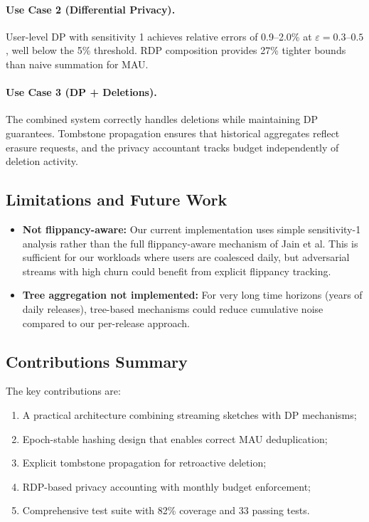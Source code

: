 \documentclass[11pt]{article}
\begin{document}
\paragraph{Use Case 2 (Differential Privacy).} User-level DP with sensitivity 1 achieves relative errors of 0.9--2.0\% at $\varepsilon = 0.3$--$0.5$, well below the 5\% threshold. RDP composition provides 27\% tighter bounds than naive summation for MAU.

\paragraph{Use Case 3 (DP + Deletions).} The combined system correctly handles deletions while maintaining DP guarantees. Tombstone propagation ensures that historical aggregates reflect erasure requests, and the privacy accountant tracks budget independently of deletion activity.

\subsection{Limitations and Future Work}

\begin{itemize}[leftmargin=*]
    \item \textbf{Not flippancy-aware:} Our current implementation uses simple sensitivity-1 analysis rather than the full flippancy-aware mechanism of Jain et al. This is sufficient for our workloads where users are coalesced daily, but adversarial streams with high churn could benefit from explicit flippancy tracking.
    
    \item \textbf{Tree aggregation not implemented:} For very long time horizons (years of daily releases), tree-based mechanisms could reduce cumulative noise compared to our per-release approach.
\end{itemize}

\subsection{Contributions Summary}

The key contributions are:
\begin{enumerate}[leftmargin=*]
    \item A practical architecture combining streaming sketches with DP mechanisms;
    \item Epoch-stable hashing design that enables correct MAU deduplication;
    \item Explicit tombstone propagation for retroactive deletion;
    \item RDP-based privacy accounting with monthly budget enforcement;
    \item Comprehensive test suite with 82\% coverage and 33 passing tests.
\end{enumerate}
\end{document}
